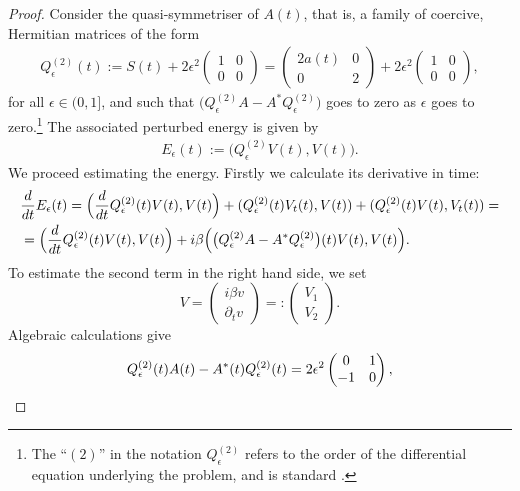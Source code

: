 \documentclass[12pt,oneside,a4paper]{book}
\numberwithin{equation}{section}     %
\theoremstyle{plain}
\theoremstyle{definition}
\begin{document}
\begin{proof}
	Consider the quasi-symmetriser of $A(t)$, that is, a family of coercive, Hermitian matrices of the form
	\begin{align*}
	Q_\epsilon^{(2)}(t):=S(t)+2\epsilon^2\begin{pmatrix}1 & 0\\ 0 & 0\end{pmatrix}=\begin{pmatrix}2 a(t) & 0\\ 0 & 2\end{pmatrix}+2\epsilon^2\begin{pmatrix}1 & 0\\ 0 & 0\end{pmatrix},
	\end{align*}
	for all $\epsilon\in(0,1]$, and such that $\big(Q_\epsilon^{(2)}A-A^{*} Q_\epsilon^{(2)}\big)$ goes to zero as $\epsilon$ goes to zero.\footnote{The ``$(2)$'' in the notation $Q^{(2)}_\epsilon$ refers to the order of the differential equation underlying the problem, and is standard \cite{DS1998,KS2006,GR2015}.} The associated perturbed energy is given by 
	\begin{align*}
	E_\epsilon(t):=\Big(Q_\epsilon^{(2)}V(t),V(t)\Big).
	\end{align*}
	We proceed estimating the energy. Firstly we calculate its derivative in time:
	\begin{align}\notag
	&\frac{d}{dt}E_\epsilon(t)= \Big(\frac{d}{dt}Q_\epsilon^{(2)}(t)V(t),V(t)\Big)+(Q_\epsilon^{(2)}(t)V_t(t),V(t))+(Q_\epsilon^{(2)}(t)V(t),V_t(t))=\\ \label{energyest}
	&=\Big(\frac{d}{dt}Q_\epsilon^{(2)}(t)V(t),V(t)\Big)+i\beta\Big(\big(Q_\epsilon^{(2)}A-A^*Q_\epsilon^{(2)}\big)(t)V(t),V(t)\Big).
	\end{align}
	To estimate the second term in the right hand side, we set 
	\[
	V=\begin{pmatrix}
	i\beta v\\
	\partial_t v
	\end{pmatrix}=:\begin{pmatrix}
	V_1\\
	V_2
	\end{pmatrix}.
	\]
	Algebraic calculations give
	\begin{align}\notag
	Q_\epsilon^{(2)}(t)A(t)-A^*(t)Q_\epsilon^{(2)}(t)=2\epsilon^2 
	\begin{pmatrix}
	0 & 1\\
	-1 & 0
	\end{pmatrix},
	\end{align}

\end{proof}
\end{document}
